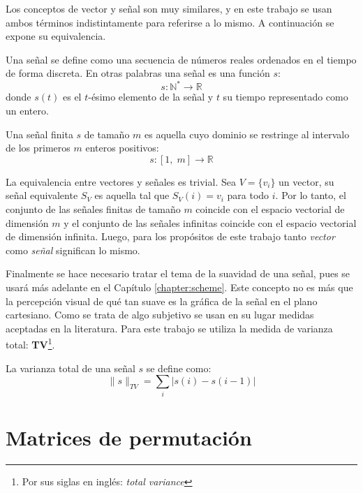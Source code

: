 Los conceptos de vector y señal son muy similares, y en este trabajo se usan ambos t\'erminos indistintamente para referirse a lo mismo. A continuaci\'on se expone su equivalencia.
\begin{definition}
	Una señal se define como una secuencia de n\'umeros reales ordenados en el tiempo de forma discreta. En otras palabras una señal es una función $s$:
	\begin{equation}
		s : \mathbb{N}^\ast \rightarrow \mathbb{R}
	\end{equation}
	donde $s(t)$ es el $t$-\'esimo elemento de la señal y $t$ su tiempo representado como un entero. 
\end{definition}
\begin{definition}
	Una señal finita $s$ de tamaño $m$ es aquella cuyo dominio se restringe al intervalo de los primeros $m$ enteros positivos:
	\begin{equation}
		s : [1,\;m] \rightarrow \mathbb{R}
	\end{equation}
\end{definition}
La equivalencia entre vectores y señales es trivial. Sea $V = \{v_i\}$ un vector, su señal equivalente $S_V$ es aquella tal que $S_V(i) = v_i$ para todo $i$. Por lo tanto, el conjunto de las señales finitas de tamaño $m$ coincide con el espacio vectorial de dimensi\'on $m$ y el conjunto de las señales infinitas coincide con el espacio vectorial de dimensi\'on infinita. Luego, para los prop\'ositos de este trabajo tanto \textit{vector} como \textit{señal} significan lo mismo.

Finalmente se hace necesario tratar el tema de la suavidad de una señal, pues se usar\'a m\'as adelante en el Cap\'itulo \ref{chapter:scheme}. Este concepto no es m\'as que la percepci\'on visual de qu\'e tan suave es la gr\'afica de la señal en el plano cartesiano. Como se trata de algo subjetivo se usan en su lugar medidas aceptadas en la literatura. Para este trabajo se utiliza la medida de varianza total: \textbf{TV}\footnote{Por sus siglas en ingl\'es: \textit{total variance}}.
\begin{definition}\label{def:tv}
	La varianza total de una señal $s$ se define como:
	\begin{equation}
		\|s\|_{TV} = \sum_{i}|s(i) - s(i - 1)|
	\end{equation}
\end{definition}

\section{Matrices de permutaci\'on}\label{sec:permutation_matrices}

